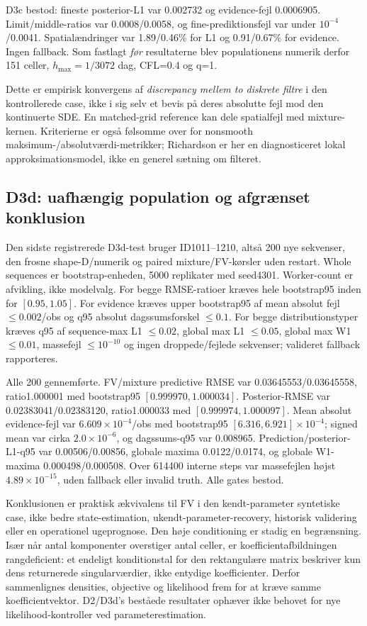 D3c bestod: fineste posterior-L1 var 0.002732 og evidence-fejl 0.0006905.
Limit/middle-ratios var 0.0008/0.0058, og fine-prediktionsfejl var under
\(10^{-4}\)/0.0041. Spatialændringer var 1.89/0.46\% for L1 og 0.91/0.67\% for
evidence. Ingen fallback. Som fastlagt \emph{før} resultaterne blev populationens
numerik derfor 151 celler, \(h_{\max}=1/3072\) dag, CFL=0.4 og q=1.

Dette er empirisk konvergens af \emph{discrepancy mellem to diskrete filtre} i den
kontrollerede case, ikke i sig selv et bevis på deres absolutte fejl mod den kontinuerte
SDE. En matched-grid reference kan dele spatialfejl med mixture-kernen. Kriterierne er
også følsomme over for nonsmooth maksimum-/absolutværdi-metrikker; Richardson er her
en diagnosticeret lokal approksimationsmodel, ikke en generel sætning om filteret.

\subsection{D3d: uafhængig population og afgrænset konklusion}
Den sidste registrerede D3d-test bruger ID1011--1210, altså 200 nye sekvenser, den
frosne shape-D/numerik og paired mixture/FV-kørsler uden restart. Whole sequences er
bootstrap-enheden, 5000 replikater med seed4301. Worker-count er afvikling, ikke modelvalg.
For begge RMSE-ratioer kræves hele bootstrap95 inden for \([0.95,1.05]\). For evidence
kræves upper bootstrap95 af mean absolut fejl \(\le0.002\)/obs og q95 absolut
 dagssumsforskel \(\le0.1\). For begge distributionstyper kræves q95 af sequence-max
L1 \(\le0.02\), global max L1 \(\le0.05\), global max W1 \(\le0.01\), massefejl
\(\le10^{-10}\) og ingen droppede/fejlede sekvenser; valideret fallback rapporteres.

Alle 200 gennemførte. FV/mixture predictive RMSE var
0.03645553/0.03645558, ratio1.000001 med bootstrap95
\([0.999970,1.000034]\). Posterior-RMSE var 0.02383041/0.02383120,
ratio1.000033 med \([0.999974,1.000097]\). Mean absolut evidence-fejl var
\(6.609\times10^{-4}\)/obs med bootstrap95 \([6.316,6.921]\times10^{-4}\);
signed mean var cirka \(2.0\times10^{-6}\), og dagssums-q95 var 0.008965.
Prediction/posterior-L1-q95 var 0.00506/0.00856, globale maxima 0.0122/0.0174,
og globale W1-maxima 0.000498/0.000508. Over 614400 interne steps var massefejlen
højst \(4.89\times10^{-15}\), uden fallback eller invalid truth. Alle gates bestod.

Konklusionen er praktisk ækvivalens til FV i den kendt-parameter syntetiske case,
ikke bedre state-estimation, ukendt-parameter-recovery, historisk validering eller en
operationel ugeprognose. Den høje conditioning er stadig en begrænsning. Især når
antal komponenter overstiger antal celler, er koefficientafbildningen rangdeficient:
et endeligt konditionstal for den rektangulære matrix beskriver kun dens returnerede
singularværdier, ikke entydige koefficienter. Derfor sammenlignes densities, objective
og likelihood frem for at kræve samme koefficientvektor. D2/D3d's beståede resultater
ophæver ikke behovet for nye likelihood-kontroller ved parameterestimation.

